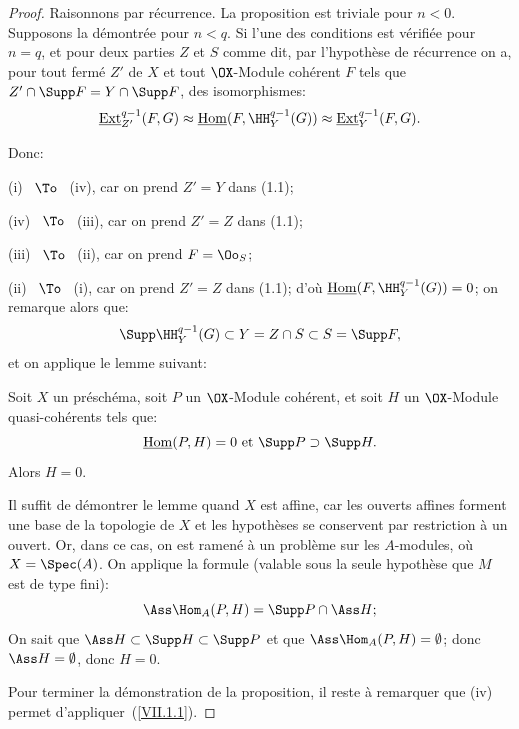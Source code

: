 \begin{proof}
Raisonnons par r\'ecurrence. La proposition est triviale pour $n < 0$. Supposons la d\'emontr\'ee pour $n < q$. Si l'une des conditions est v\'erifi\'ee pour $n = q$, et pour deux parties $Z$ et $S$ comme dit, par l'hypoth\`ese de r\'ecurrence on a, pour tout ferm\'e $Z'$ de $X$ et tout $\OX$-Module coh\'erent $F$ tels que $Z' \cap \Supp F = Y \cap \Supp F$, des isomorphismes:
\begin{equation}\label{eq:VII.1.1}\mathop{\underline{\mathrm{Ext}}}\nolimits^{q-1}_{Z'} (F, G) \approx \mathop{\underline{\mathrm{Hom}}}\nolimits (F, \HH^{q-1}_Y (G)) \approx \mathop{\underline{\mathrm{Ext}}}\nolimits^{q-1}_Y (F, G).\end{equation}

\noindent Donc:

(i) ~$\To$~ (iv), car on prend $Z' = Y$ dans (1.1);

(iv) ~$\To$~ (iii), car on prend $Z' = Z$ dans (1.1);

(iii) ~$\To$~ (ii), car on prend $F = \Oo_S$;

(ii) ~$\To$~ (i), car on prend $Z' = Z$ dans (1.1); d'o\`u $\mathop{\underline{\mathrm{Hom}}}\nolimits (F, \HH_Y^{q-1} (G)) = 0$; on remarque alors que:
\[
\Supp \HH_Y^{q-1} (G) \subset Y = Z \cap S \subset S = \Supp F,
\]
et on applique le lemme suivant:

\begin{lemme} \label{VII.1.3}
Soit $X$ un pr\'esch\'ema, soit $P$ un $\OX$-Module coh\'erent, et soit $H$ un $\OX$-Module quasi-coh\'erents tels que:
\[
\mathop{\underline{\mathrm{Hom}}}\nolimits (P, H) = 0 \text{ et } \Supp P \supset \Supp H.
\]
Alors $H = 0$.
\end{lemme}

Il suffit de d\'emontrer le lemme quand $X$ est affine, car les ouverts affines forment une base de la topologie de $X$ et les hypoth\`eses se conservent par restriction \`a un ouvert. Or, dans ce cas, on est ramen\'e \`a un probl\`eme sur les $A$-modules, o\`u $X = \Spec(A)$. On applique la formule (valable sous la seule hypoth\`ese que $M$ est de type fini):
\[
\Ass \Hom_A (P, H) = \Supp P \cap \Ass H;\]
On sait que $\Ass H \subset \Supp H \subset \Supp P$ et que $\Ass \Hom_A (P, H) = \emptyset$; donc $\Ass H = \emptyset$, donc $H = 0$.

Pour terminer la d\'emonstration de la proposition, il reste \`a remarquer que (iv) permet d'appliquer~(\ref{VII.1.1}).
\skipqed
\end{proof}

